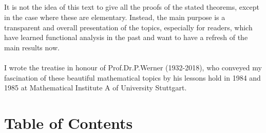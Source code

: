 \documentclass[11pt,twoside]{article}
\begin{document}
\subparagraph{}
It is not the idea of this text to give all the proofs of the stated theorems,
except in the case where these are elementary.
Instead,
the main purpose is a transparent and overall presentation of the topics,
especially for readers, which have learned functional analysis in the past
and want to have a refresh of the main results now.

\paragraph{} %
I wrote the treatise in honour of Prof.\;Dr.\;P.\;Werner (1932-2018),
who conveyed my fascination of these beautiful mathematical topics
by his lessons hold in 1984 and 1985 at
Mathematical Institute A of University Stuttgart.

\newpage
\thispagestyle{empty}
\section*{Table of Contents}
\vspace{20pt}
\end{document}
